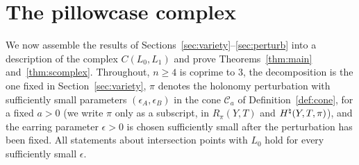\section{The pillowcase complex}\label{sec:complex}

We now assemble the results of Sections~\ref{sec:variety}--\ref{sec:perturb} into a description of the
complex $C(L_0,L_1)$ and prove Theorems~\ref{thm:main} and~\ref{thm:scomplex}. Throughout, $n\ge4$ is coprime
to $3$, the decomposition is the one fixed in Section~\ref{sec:variety}, $\pi$ denotes the holonomy perturbation
with sufficiently small parameters $(\epsilon_A,\epsilon_B)$ in the cone $\mathcal C_a$ of Definition~\ref{def:cone}, for a fixed
$a>0$ (we write $\pi$ only as a subscript, in $R_\pi(Y,T)$ and $H^{\natural}(Y,T,\pi)$), and the earring parameter $\epsilon>0$ is
chosen sufficiently small after the perturbation has been fixed. All statements about intersection points with $L_0$ hold
for every sufficiently small $\epsilon$.

